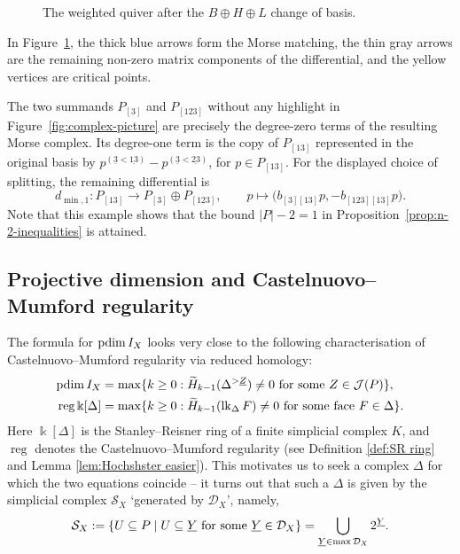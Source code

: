 \documentclass[a4paper,leqno]{amsart}
\begin{document}
\begin{eg}
\begin{figure}[htbp]
\caption{The weighted quiver after the $B\oplus H\oplus L$ change
of basis.}
\label{fig:morse-matching-change-of-basis}
\end{figure}

In Figure~\ref{fig:morse-matching-change-of-basis}, the thick blue arrows form the Morse matching, the thin gray arrows are the remaining non-zero matrix components of the differential, and the yellow vertices are critical points.

The two summands $P_{[3]}$ and $P_{[123]}$ without any highlight in Figure~\ref{fig:complex-picture} are precisely the degree-zero terms of the resulting Morse complex.  Its degree-one term is the copy of $P_{[13]}$ represented in the original basis by $p^{(\underline{3}<\underline{13})}-p^{(\underline{3}<\underline{23})}$, for $p\in P_{[13]}$. For the displayed choice of splitting, the remaining differential is
\[
 d_{\min,1}\colon P_{[13]}\longrightarrow P_{[3]}\oplus P_{[123]},
 \qquad
 p\longmapsto
 \bigl(b_{[3][13]}p,-b_{[123][13]}p\bigr).
\]
Note that this example shows that the bound $|P|-2=1$ in Proposition~\ref{prop:n-2-inequalities} is attained.
\end{eg}

\subsection{Projective dimension and Castelnuovo--Mumford regularity}\label{subsec:CM regularity}
The formula for $\operatorname{pdim} I_X$ looks very close to the following characterisation of Castelnuovo--Mumford regularity via reduced homology:
\begin{align}
\operatorname{pdim} I_X
&=\max\{k\geq 0:\widetilde H_{k-1}(\Delta^{>\underline{Z}})\neq 0 \text{ for some }Z\in \mathcal{J}(P)\}, \\
\operatorname{reg}\Bbbk[\Delta]
&=\max\{k\geq 0:\widetilde H_{k-1}(\operatorname{lk}_\Delta F)\neq 0 \text{ for some face }F\in \Delta\}. \label{eq:reg=non-vanishing homology}
\end{align}
Here $\Bbbk[\Delta]$ is the Stanley--Reisner ring of a finite simplicial complex $K$, and $\operatorname{reg}$ denotes the Castelnuovo--Mumford regularity (see Definition \ref{def:SR ring} and Lemma \ref{lem:Hochshster easier}). This motivates us to seek a complex $\Delta$ for which the two equations coincide -- it turns out that such a $\Delta$ is given by the simplicial complex $\mathcal{S}_X$ `generated by $\mathcal{D}_X$', namely,\[
\mathcal S_X:=\{U\subseteq P \mid U\subseteq \underline{Y} \text{ for some }\underline{Y}\in\mathcal D_X\} = \bigcup_{\underline{Y}\in \max \mathcal D_X} 2^{\underline{Y}}.
\]
\end{document}
